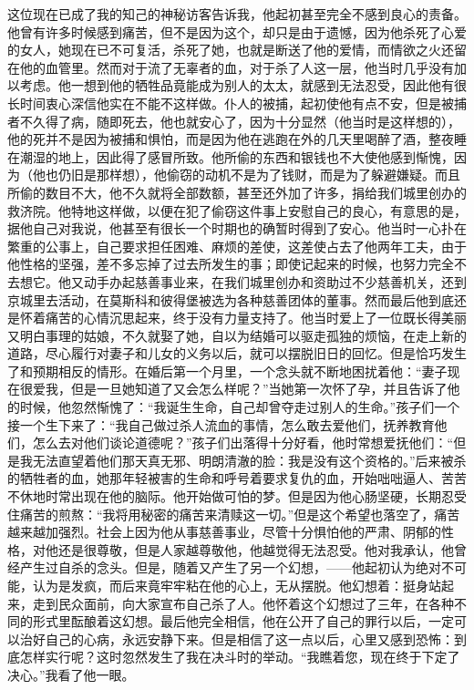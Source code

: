 \par 这位现在已成了我的知己的神秘访客告诉我，他起初甚至完全不感到良心的责备。他曾有许多时候感到痛苦，但不是因为这个，却只是由于遗憾，因为他杀死了心爱的女人，她现在已不可复活，杀死了她，也就是断送了他的爱情，而情欲之火还留在他的血管里。然而对于流了无辜者的血，对于杀了人这一层，他当时几乎没有加以考虑。他一想到他的牺牲品竟能成为别人的太太，就感到无法忍受，因此他有很长时间衷心深信他实在不能不这样做。仆人的被捕，起初使他有点不安，但是被捕者不久得了病，随即死去，他也就安心了，因为十分显然（他当时是这样想的），他的死并不是因为被捕和惧怕，而是因为他在逃跑在外的几天里喝醉了酒，整夜睡在潮湿的地上，因此得了感冒所致。他所偷的东西和银钱也不大使他感到惭愧，因为（他也仍旧是那样想），他偷窃的动机不是为了钱财，而是为了躲避嫌疑。而且所偷的数目不大，他不久就将全部数额，甚至还外加了许多，捐给我们城里创办的救济院。他特地这样做，以便在犯了偷窃这件事上安慰自己的良心，有意思的是，据他自己对我说，他甚至有很长一个时期也的确暂时得到了安心。他当时一心扑在繁重的公事上，自己要求担任困难、麻烦的差使，这差使占去了他两年工夫，由于他性格的坚强，差不多忘掉了过去所发生的事；即使记起来的时候，也努力完全不去想它。他又动手办起慈善事业来，在我们城里创办和资助过不少慈善机关，还到京城里去活动，在莫斯科和彼得堡被选为各种慈善团体的董事。然而最后他到底还是怀着痛苦的心情沉思起来，终于没有力量支持了。他当时爱上了一位既长得美丽又明白事理的姑娘，不久就娶了她，自以为结婚可以驱走孤独的烦恼，在走上新的道路，尽心履行对妻子和儿女的义务以后，就可以摆脱旧日的回忆。但是恰巧发生了和预期相反的情形。在婚后第一个月里，一个念头就不断地困扰着他：“妻子现在很爱我，但是一旦她知道了又会怎么样呢？”当她第一次怀了孕，并且告诉了他的时候，他忽然惭愧了：“我诞生生命，自己却曾夺走过别人的生命。”孩子们一个接一个生下来了：“我自己做过杀人流血的事情，怎么敢去爱他们，抚养教育他们，怎么去对他们谈论道德呢？”孩子们出落得十分好看，他时常想爱抚他们：“但是我无法直望着他们那天真无邪、明朗清澈的脸：我是没有这个资格的。”后来被杀的牺牲者的血，她那年轻被害的生命和呼号着要求复仇的血，开始咄咄逼人、苦苦不休地时常出现在他的脑际。他开始做可怕的梦。但是因为他心肠坚硬，长期忍受住痛苦的煎熬：“我将用秘密的痛苦来清赎这一切。”但是这个希望也落空了，痛苦越来越加强烈。社会上因为他从事慈善事业，尽管十分惧怕他的严肃、阴郁的性格，对他还是很尊敬，但是人家越尊敬他，他越觉得无法忍受。他对我承认，他曾经产生过自杀的念头。但是，随着又产生了另一个幻想，——他起初认为绝对不可能，认为是发疯，而后来竟牢牢粘在他的心上，无从摆脱。他幻想着：挺身站起来，走到民众面前，向大家宣布自己杀了人。他怀着这个幻想过了三年，在各种不同的形式里酝酿着这幻想。最后他完全相信，他在公开了自己的罪行以后，一定可以治好自己的心病，永远安静下来。但是相信了这一点以后，心里又感到恐怖：到底怎样实行呢？这时忽然发生了我在决斗时的举动。“我瞧着您，现在终于下定了决心。”我看了他一眼。
